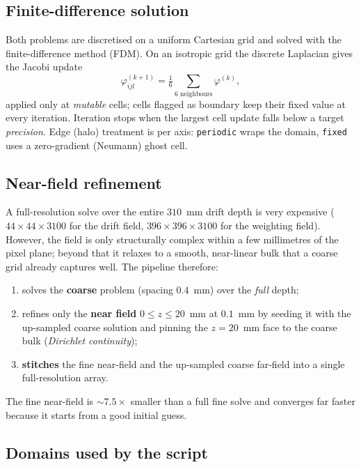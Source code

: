 \documentclass[11pt]{article}
\begin{document}
\subsection{Finite-difference solution}

Both problems are discretised on a uniform Cartesian grid and solved with
the finite-difference method (FDM).  On an isotropic grid the discrete
Laplacian gives the Jacobi update
\begin{equation}
  \varphi^{(k+1)}_{ijl}
   = \tfrac{1}{6}\!\!\sum_{\text{6 neighbours}}\!\!\varphi^{(k)} ,
  \label{eq:jacobi}
\end{equation}
applied only at \emph{mutable} cells; cells flagged as boundary keep their
fixed value at every iteration.  Iteration stops when the largest cell
update falls below a target \emph{precision}.  Edge (halo) treatment is
per axis: \texttt{periodic} wraps the domain, \texttt{fixed} uses a
zero-gradient (Neumann) ghost cell.

\subsection{Near-field refinement}

A full-resolution solve over the entire $310$~mm drift depth is very
expensive ($44\times44\times3100$ for the drift field,
$396\times396\times3100$ for the weighting field).  However, the field is
only structurally complex within a few millimetres of the pixel plane;
beyond that it relaxes to a smooth, near-linear bulk that a coarse grid
already captures well.  The pipeline therefore:
\begin{enumerate}
  \item solves the \textbf{coarse} problem (spacing $0.4$~mm) over the
        \emph{full} depth;
  \item refines only the \textbf{near field} $0\le z\le 20$~mm at
        $0.1$~mm by seeding it with the up-sampled coarse solution and
        pinning the $z=20$~mm face to the coarse bulk
        (\emph{Dirichlet continuity});
  \item \textbf{stitches} the fine near-field and the up-sampled coarse
        far-field into a single full-resolution array.
\end{enumerate}
The fine near-field is $\sim 7.5\times$ smaller than a full fine solve and
converges far faster because it starts from a good initial guess.

\subsection{Domains used by the script}
\end{document}
